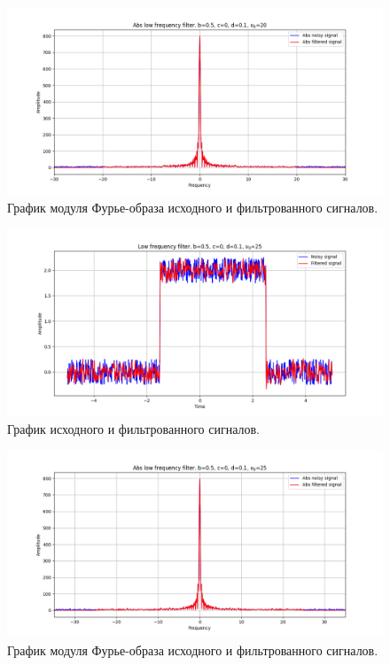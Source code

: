 \documentclass[a4paper, 12pt]{article}
\begin{document}
    \begin{figure}[!htb]
        \centering
        \includegraphics[scale=0.485]{6_abs_u_U_nohigh.png}
        \captionsetup{skip=0pt}
        \caption{График модуля Фурье-образа исходного и фильтрованного сигналов.}
        \label{fig:fig22}
    \end{figure}
    \begin{figure}[!htb]
        \centering
        \includegraphics[scale=0.485]{10_u_flt_u_nohigh.png}
        \captionsetup{skip=0pt}
        \caption{График исходного и фильтрованного сигналов.}
        \label{fig:fig23}
    \end{figure}
    \begin{figure}[!htb]
        \centering
        \includegraphics[scale=0.485]{10_abs_u_U_nohigh.png}
        \captionsetup{skip=0pt}
        \caption{График модуля Фурье-образа исходного и фильтрованного сигналов.}
        \label{fig:fig24}
    \end{figure}
\end{document}
